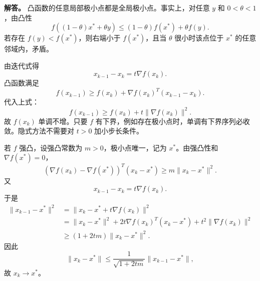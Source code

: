 ﻿\documentclass[UTF8,12pt]{ctexart}
\begin{document}
\begin{enumerate}[label=\textbf{\arabic*.},leftmargin=2.2em]
\textbf{解答。} 凸函数的任意局部极小点都是全局极小点。事实上，对任意 \(y\) 和 \(0<\theta<1\)，由凸性
\[
f((1-\theta)x^\ast+\theta y)
\le (1-\theta)f(x^\ast)+\theta f(y).
\]
若存在 \(f(y)<f(x^\ast)\)，则右端小于 \(f(x^\ast)\)，且当 \(\theta\) 很小时该点位于 \(x^\ast\) 的任意邻域内，矛盾。

由迭代式得
\[
x_{k-1}-x_k=t\nabla f(x_k).
\]
凸函数满足
\[
f(x_{k-1})\ge f(x_k)+\nabla f(x_k)^T(x_{k-1}-x_k).
\]
代入上式：
\[
f(x_{k-1})\ge f(x_k)+t\|\nabla f(x_k)\|^2.
\]
故 \(f(x_k)\) 单调不增。只要 \(f\) 有下界，例如存在极小点时，单调有下界序列必收敛。隐式方法不需要对 \(t>0\) 加小步长条件。

若 \(f\) 强凸，设强凸常数为 \(m>0\)，极小点唯一，记为 \(x^\ast\)。由强凸性和 \(\nabla f(x^\ast)=0\)，
\[
(\nabla f(x_k)-\nabla f(x^\ast))^T(x_k-x^\ast)\ge m\|x_k-x^\ast\|^2.
\]
又
\[
x_{k-1}-x_k=t\nabla f(x_k).
\]
于是
\[
\begin{aligned}
\|x_{k-1}-x^\ast\|^2
&=\|x_k-x^\ast+t\nabla f(x_k)\|^2\\
&=\|x_k-x^\ast\|^2+2t\nabla f(x_k)^T(x_k-x^\ast)+t^2\|\nabla f(x_k)\|^2\\
&\ge (1+2tm)\|x_k-x^\ast\|^2.
\end{aligned}
\]
因此
\[
\|x_k-x^\ast\|\le \frac1{\sqrt{1+2tm}}\|x_{k-1}-x^\ast\|,
\]
故 \(x_k\to x^\ast\)。
\end{enumerate}
\end{document}
